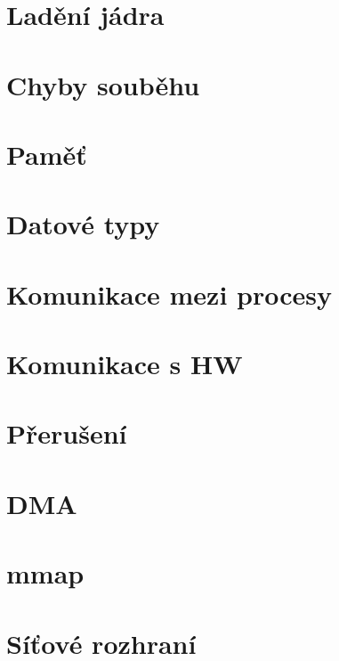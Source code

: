 

\section{Ladění jádra}
\frame{\sectionpage}


\section{Chyby souběhu}
\frame{\sectionpage}


\section{Paměť}
\frame{\sectionpage}


\section{Datové typy}
\frame{\sectionpage}


\section{Komunikace mezi procesy}
\frame{\sectionpage}


\section{Komunikace s HW}
\frame{\sectionpage}


\section{Přerušení}
\frame{\sectionpage}


\section{DMA}
\frame{\sectionpage}


\section{mmap}
\frame{\sectionpage}


\section{Síťové rozhraní}
\frame{\sectionpage}


%


